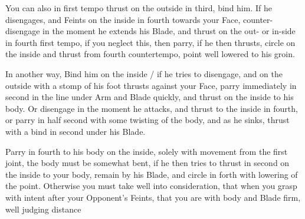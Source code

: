 You can also in first tempo thrust on the outside in third, bind
him. If he disengages, and Feints on the inside in fourth towards your
Face, counter-disengage in the moment he extends his Blade, and thrust
on the out- or in-side in fourth first tempo, if you neglect this,
then parry, if he then thrusts, circle on the inside and thrust from
fourth countertempo, point well lowered to his groin.


In another way, Bind him on the inside / if he tries to disengage, and
on the outside with a stomp of his foot thrusts against your Face,
parry immediately in second in the line under Arm and Blade quickly,
and thrust on the inside to his body. Or disengage in the moment he
attacks, and thrust to the inside in fourth, or parry in half second
with some twisting of the body, and as he sinks, thrust with a bind in
second under his Blade.


Parry in fourth to his body on the inside, solely with movement from
the first joint, the body must be somewhat bent, if he then tries to
thrust in second on the inside to your body, remain by his Blade, and
circle in forth with lowering of the point. Otherwise you must take
well into consideration, that when you grasp with intent after your
Opponent's Feints, that you are with body and Blade firm, well judging distance
